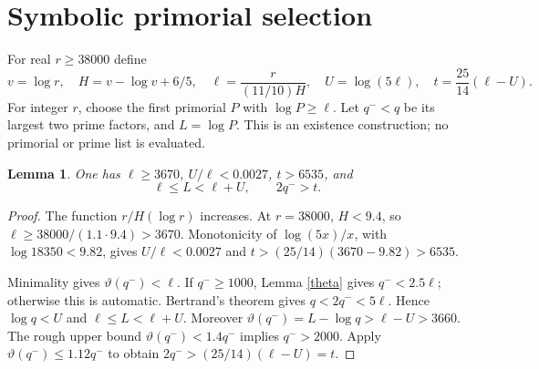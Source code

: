 \documentclass[11pt]{article}
\newtheorem{lemma}[theorem]{Lemma}
\begin{document}
\section{Symbolic primorial selection}
For real $r\ge38000$ define
\[
 v=\log r,\quad H=v-\log v+6/5,\quad
 \ell=\frac{r}{(11/10)H},\quad U=\log(5\ell),\quad
 t=\frac{25}{14}(\ell-U). \tag{P}
\]
For integer $r$, choose the first primorial $P$ with $\log P\ge\ell$.
Let $q^-<q$ be its largest two prime factors, and $L=\log P$.
This is an existence construction; no primorial or prime list is evaluated.

\begin{lemma}\label{selection}
One has $\ell\ge3670$, $U/\ell<0.0027$, $t>6535$, and
\[
          \ell\le L<\ell+U,\qquad 2q^->t.
\]
\end{lemma}
\begin{proof}
The function $r/H(\log r)$ increases.
At $r=38000$, $H<9.4$, so $\ell\ge38000/(1.1\cdot9.4)>3670$.
Monotonicity of $\log(5x)/x$, with $\log18350<9.82$, gives
$U/\ell<0.0027$ and $t>(25/14)(3670-9.82)>6535$.

Minimality gives $\vartheta(q^-)<\ell$.
If $q^-\ge1000$, Lemma \ref{theta} gives $q^-<2.5\ell$;
otherwise this is automatic. Bertrand's theorem gives $q<2q^-<5\ell$.
Hence $\log q<U$ and $\ell\le L<\ell+U$.
Moreover $\vartheta(q^-)=L-\log q>\ell-U>3660$.
The rough upper bound $\vartheta(q^-)<1.4q^-$ implies $q^->2000$.
Apply $\vartheta(q^-)\le1.12q^-$ to obtain
$2q^->(25/14)(\ell-U)=t$.
\end{proof}
\end{document}

